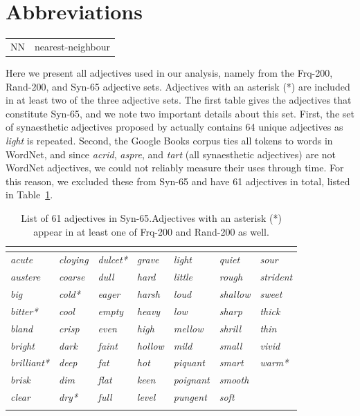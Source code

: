 \documentclass[output=paper]{langsci/langscibook}
\begin{document}
\section*{Abbreviations}
\begin{tabularx}{\textwidth}{@{}lQ@{}}
NN & nearest-neighbour
\end{tabularx}


\largerpage

Here we present all adjectives used in our analysis, namely from the {\sc Frq-200}, {\sc Rand-200}, and {\sc Syn-65} adjective sets.
Adjectives with an asterisk (*) are included in at least two of the three adjective sets.
The first table gives the adjectives that constitute {\sc Syn-65}, and we note two important details about this set.
First, the set of synaesthetic adjectives proposed by \citet{williams1976} actually contains 64 unique adjectives as {\it light} is repeated.
Second, the Google Books corpus ties all tokens to words in WordNet, and since {\it acrid}, {\it aspre}, and {\it tart} (all synaesthetic adjectives) are not WordNet adjectives, we could not reliably measure their uses through time.
For this reason, we excluded these from {\sc Syn-65} and have 61 adjectives in total, listed in Table~\ref{tab:synadjs}.

\begin{table}\footnotesize
\caption{List of 61 adjectives in {\sc Syn-65}.\label{tab:synadjs}
Adjectives with an asterisk (*) appear in at least one of {\sc Frq-200} and {\sc Rand-200} as well.}
\begin{tabular}{ *{7}{>{\itshape}l} }
\lsptoprule
\multicolumn{7}{c}{\normalfont\scshape Syn-65}\\
\midrule
acute & cloying & dulcet* & grave & light & quiet & sour \\
austere & coarse & dull & hard & little & rough & strident \\
big & cold* & eager & harsh & loud & shallow & sweet \\
bitter* & cool & empty & heavy & low & sharp & thick \\
bland & crisp & even & high & mellow & shrill & thin \\
bright & dark & faint & hollow & mild & small & vivid \\
brilliant* & deep & fat & hot & piquant & smart & warm* \\
brisk & dim & flat & keen & poignant & smooth & \\
clear & dry* & full & level & pungent & soft & \\
\lspbottomrule
\end{tabular}
\end{table}
\end{document}
